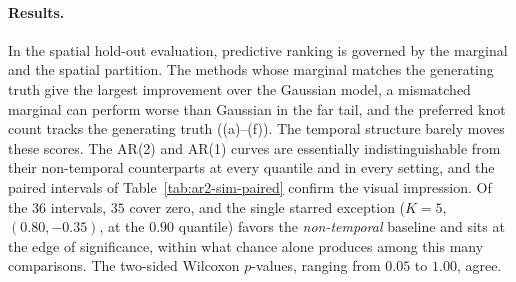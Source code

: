 \documentclass[12pt]{article}
\begin{document}
\paragraph{Results.}\label{sec:sim-ar2-results}
In the spatial hold-out evaluation, predictive ranking is governed by the marginal and the spatial partition.  The methods whose marginal matches the generating truth give the largest improvement over the Gaussian model, a mismatched marginal can perform worse than Gaussian in the far tail, and the preferred knot count tracks the generating truth ((a)--(f)).  The temporal structure barely moves these scores.  The AR(2) and AR(1) curves are essentially indistinguishable from their non-temporal counterparts at every quantile and in every setting, and the paired intervals of Table~\ref{tab:ar2-sim-paired} confirm the visual impression.  Of the $36$ intervals, $35$ cover zero, and the single starred exception ($K=5$, $(0.80, -0.35)$, at the $0.90$ quantile) favors the \emph{non-temporal} baseline and sits at the edge of significance, within what chance alone produces among this many comparisons.  The two-sided Wilcoxon $p$-values, ranging from $0.05$ to $1.00$, agree.
\end{document}
